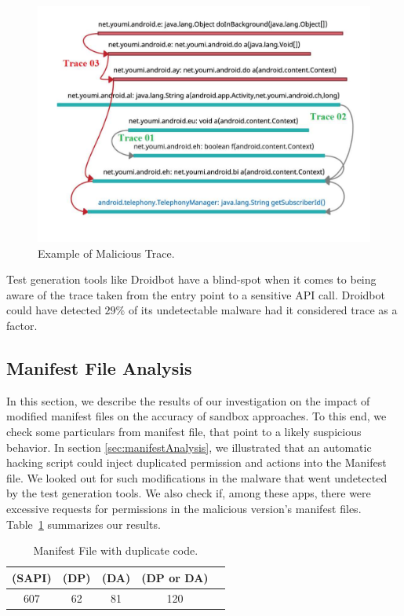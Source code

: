 \begin{figure}
\centering
\includegraphics[scale=0.28]{images/maliciousTrace_example01.pdf}
\caption{Example of Malicious Trace.}
 \label{fig:maliciousTrace}
\end{figure}

\begin{obs}{2}{}
 Test generation tools like Droidbot have a blind-spot when it comes to being aware of the trace taken from the entry point to a sensitive API call. Droidbot could have detected $29\%$ of its undetectable malware had it considered trace as a factor.
 \end{obs}

\subsection{Manifest File Analysis}\label{sec:manifestResults}

In this section, we describe the results of our investigation on the impact of modified manifest files on the accuracy of sandbox approaches. 
To this end, we check some particulars from manifest file, that point to a likely suspicious behavior. In section \ref{sec:manifestAnalysis}, we illustrated that an automatic hacking script could inject duplicated permission and actions into the Manifest file. We looked out for such modifications in the malware that went undetected by the test generation tools. We also check if, among these apps, there were excessive requests for permissions in the malicious version's manifest files. Table~\ref{tab:mfa} summarizes our results. 

\begin{table}[ht]
  \caption{Manifest File with duplicate code.}
  \centering
  \begin{small}
 \begin{tabular}{ccccc}
   \toprule
   (SAPI) & (DP) & (DA) & (DP or DA) \\   \midrule
   607 & 62 & 81 & 120 \\ 
   
 \bottomrule
 \end{tabular}
 \end{small}
 \label{tab:mfa}
\end{table}

